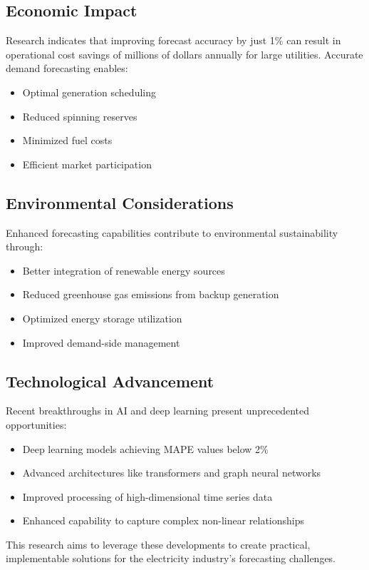 \documentclass[12pt,a4paper]{report}
\begin{document}
\subsection{Economic Impact}
Research indicates that improving forecast accuracy by just 1\% can result in operational cost savings of millions of dollars annually for large utilities. Accurate demand forecasting enables:
\begin{itemize}
\item Optimal generation scheduling
\item Reduced spinning reserves
\item Minimized fuel costs
\item Efficient market participation
\end{itemize}

\subsection{Environmental Considerations}
Enhanced forecasting capabilities contribute to environmental sustainability through:
\begin{itemize}
\item Better integration of renewable energy sources
\item Reduced greenhouse gas emissions from backup generation
\item Optimized energy storage utilization
\item Improved demand-side management
\end{itemize}

\subsection{Technological Advancement}
Recent breakthroughs in AI and deep learning present unprecedented opportunities:
\begin{itemize}
\item Deep learning models achieving MAPE values below 2\%
\item Advanced architectures like transformers and graph neural networks
\item Improved processing of high-dimensional time series data
\item Enhanced capability to capture complex non-linear relationships
\end{itemize}

This research aims to leverage these developments to create practical, implementable solutions for the electricity industry's forecasting challenges.
\end{document}
